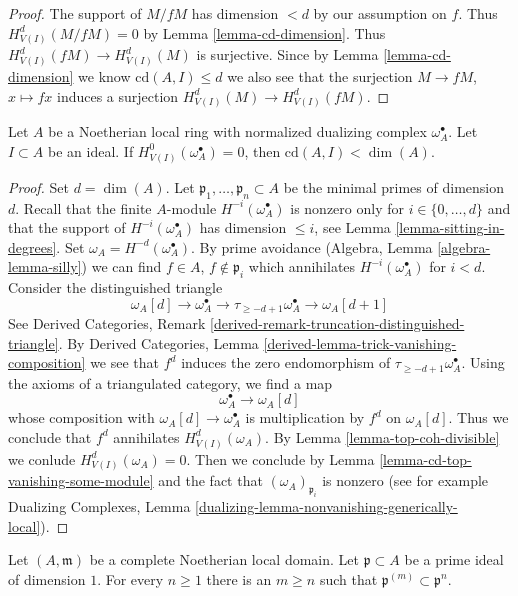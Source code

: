 \begin{proof}
The support of $M/fM$ has dimension $< d$ by our assumption on $f$.
Thus $H^d_{V(I)}(M/fM) = 0$ by Lemma \ref{lemma-cd-dimension}.
Thus $H^d_{V(I)}(fM) \to H^d_{V(I)}(M)$ is surjective.
Since by Lemma \ref{lemma-cd-dimension} we know $\text{cd}(A, I) \leq d$
we also see that the surjection $M \to fM$, $x \mapsto fx$
induces a surjection $H^d_{V(I)}(M) \to H^d_{V(I)}(fM)$.
\end{proof}

\begin{lemma}
\label{lemma-cd-bound-dualizing}
Let $A$ be a Noetherian local ring with
normalized dualizing complex $\omega_A^\bullet$.
Let $I \subset A$ be an ideal.
If $H^0_{V(I)}(\omega_A^\bullet) = 0$, then $\text{cd}(A, I) < \dim(A)$.
\end{lemma}

\begin{proof}
Set $d = \dim(A)$. Let $\mathfrak p_1, \ldots, \mathfrak p_n \subset A$
be the minimal primes of dimension $d$.
Recall that the finite $A$-module
$H^{-i}(\omega_A^\bullet)$ is nonzero only for
$i \in \{0, \ldots, d\}$ and that the support
of $H^{-i}(\omega_A^\bullet)$ has dimension $\leq i$, see
Lemma \ref{lemma-sitting-in-degrees}.
Set $\omega_A = H^{-d}(\omega_A^\bullet)$.
By prime avoidance (Algebra, Lemma \ref{algebra-lemma-silly})
we can find $f \in A$, $f \not \in \mathfrak p_i$
which annihilates $H^{-i}(\omega_A^\bullet)$ for $i < d$.
Consider the distinguished triangle
$$
\omega_A[d] \to \omega_A^\bullet \to
\tau_{\geq -d + 1}\omega_A^\bullet \to \omega_A[d + 1]
$$
See Derived Categories, Remark
\ref{derived-remark-truncation-distinguished-triangle}.
By Derived Categories, Lemma \ref{derived-lemma-trick-vanishing-composition}
we see that $f^d$ induces the zero endomorphism of
$\tau_{\geq -d + 1}\omega_A^\bullet$.
Using the axioms of a triangulated category, we find a map
$$
\omega_A^\bullet \to \omega_A[d]
$$
whose composition with $\omega_A[d] \to \omega_A^\bullet$ is
multiplication by $f^d$ on $\omega_A[d]$.
Thus we conclude that $f^d$ annihilates $H^d_{V(I)}(\omega_A)$.
By Lemma \ref{lemma-top-coh-divisible} we conlude $H^d_{V(I)}(\omega_A) = 0$.
Then we conclude by Lemma \ref{lemma-cd-top-vanishing-some-module}
and the fact that $(\omega_A)_{\mathfrak p_i}$ is nonzero
(see for example
Dualizing Complexes, Lemma
\ref{dualizing-lemma-nonvanishing-generically-local}).
\end{proof}

\begin{lemma}
\label{lemma-inverse-system-symbolic-powers}
Let $(A, \mathfrak m)$ be a complete Noetherian local domain. Let
$\mathfrak p \subset A$ be a prime ideal of dimension $1$.
For every $n \geq 1$ there is an $m \geq n$ such that
$\mathfrak p^{(m)} \subset \mathfrak p^n$.
\end{lemma}

